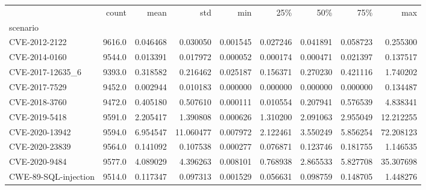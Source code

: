 \begin{tabular}{lrrrrrrrr}
\toprule
{} &   count &      mean &        std &       min &       25\% &       50\% &       75\% &        max \\
scenario             &         &           &            &           &           &           &           &            \\
\midrule
CVE-2012-2122        &  9616.0 &  0.046468 &   0.030050 &  0.001545 &  0.027246 &  0.041891 &  0.058723 &   0.255300 \\
CVE-2014-0160        &  9544.0 &  0.013391 &   0.017972 &  0.000052 &  0.000174 &  0.000471 &  0.021397 &   0.137517 \\
CVE-2017-12635\_6     &  9393.0 &  0.318582 &   0.216462 &  0.025187 &  0.156371 &  0.270230 &  0.421116 &   1.740202 \\
CVE-2017-7529        &  9452.0 &  0.002944 &   0.010183 &  0.000000 &  0.000000 &  0.000000 &  0.000000 &   0.134487 \\
CVE-2018-3760        &  9472.0 &  0.405180 &   0.507610 &  0.000111 &  0.010554 &  0.207941 &  0.576539 &   4.838341 \\
CVE-2019-5418        &  9591.0 &  2.205417 &   1.390808 &  0.000626 &  1.310200 &  2.091063 &  2.955049 &  12.212255 \\
CVE-2020-13942       &  9594.0 &  6.954547 &  11.060477 &  0.007972 &  2.122461 &  3.550249 &  5.856254 &  72.208123 \\
CVE-2020-23839       &  9564.0 &  0.141092 &   0.107538 &  0.000277 &  0.076871 &  0.123746 &  0.181755 &   1.146535 \\
CVE-2020-9484        &  9577.0 &  4.089029 &   4.396263 &  0.008101 &  0.768938 &  2.865533 &  5.827708 &  35.307698 \\
CWE-89-SQL-injection &  9514.0 &  0.117347 &   0.097313 &  0.001529 &  0.056631 &  0.098759 &  0.148705 &   1.448276 \\
\bottomrule
\end{tabular}
